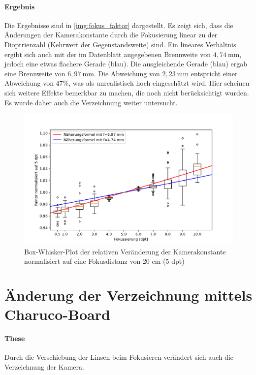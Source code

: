 \documentclass[./00PhotoBox.tex]{subfiles}
\begin{document}
\paragraph{Ergebnis}
Die Ergebnisse sind in \autoref{img:fokus_faktor} dargestellt. Es zeigt sich, dass die Änderungen der Kamerakonstante durch die Fokusierung linear zu der Dioptrienzahl (Kehrwert der Gegenstandsweite) sind. Ein lineares Verhältnis ergibt sich auch mit der im Datenblatt angegebenen Brennweite von $4,74~\text{mm}$, jedoch eine etwas flachere Gerade (blau). Die ausgleichende Gerade (blau) ergab eine Brennweite von $6,97~\text{mm}$. Die Abweichung von $2,23~\text{mm}$ entspricht einer Abweichung von $47\%$, was als unrealistisch hoch eingeschätzt wird. Hier scheinen sich weitere Effekte bemerkbar zu machen, die noch nicht berücksichtigt wurden. Es wurde daher auch die Verzeichnung weiter untersucht.

\begin{figure}
    \centering
    \includegraphics[width=1\textwidth]{./img/fokus_faktor_diagramm_box.pdf}
    \centering
    \caption{Box-Whisker-Plot der relativen Veränderung der Kamerakonstante normalisiert auf eine Fokusdistanz von 20 cm (5 dpt)} %
    \label{img:fokus_faktor} %
\end{figure}



\section{Änderung der Verzeichnung mittels Charuco-Board}

\paragraph{These}
Durch die Verschiebung der Linsen beim Fokusieren verändert sich auch die Verzeichnung der Kamera.
\end{document}
